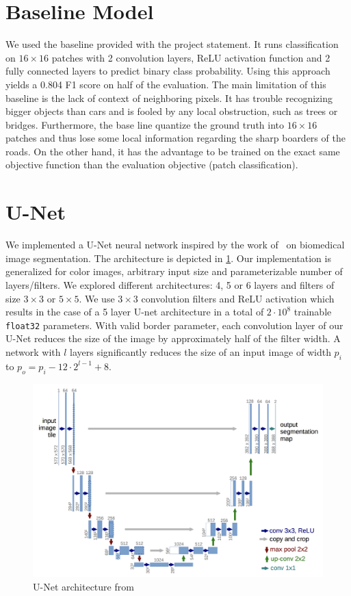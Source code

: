 \documentclass[10pt,conference,compsocconf]{IEEEtran}
\begin{document}
\section{Baseline Model}\label{sec:baseline}

We used the baseline provided with the project statement. It runs classification on $16\times16$ patches with 2 convolution layers, ReLU activation function and 2 fully connected layers to predict binary class probability. Using this approach yields a 0.804 F1 score on half of the evaluation. The main limitation of this baseline is the lack of context of neighboring pixels. It has trouble recognizing bigger objects than cars and is fooled by any local obstruction, such as trees or bridges. Furthermore, the base line quantize the ground truth into $16\times16$ patches and thus lose some local information regarding the sharp boarders of the roads. On the other hand, it has the advantage to be trained on the exact same objective function than the evaluation objective (patch classification).

\section{U-Net}\label{sec:unet}

We implemented a U-Net neural network inspired by the work of~\cite{unet} on biomedical image segmentation. The architecture is depicted in \cref{fig:unet}. Our implementation is generalized for color images, arbitrary input size and parameterizable number of layers/filters. We explored different architectures: 4, 5 or 6 layers and filters of size $3\times3$ or $5\times5$. We use $3\times3$ convolution filters and ReLU activation which results in the case of a 5 layer U-net architecture in a total of $2\cdot 10^8$ trainable \texttt{float32} parameters. With valid border parameter, each convolution layer of our U-Net reduces the size of the image by approximately half of the filter width. A network with $l$ layers significantly reduces the size of an input image of width $p_i$ to $p_o=p_i-12\cdot2^{l-1}+8$.

\begin{figure}
  \includegraphics[width=0.95\columnwidth]{figures/unet.png}
  \caption{U-Net architecture from~\cite{unet}\label{fig:unet}}
\end{figure}
\end{document}
